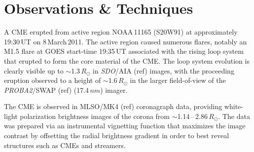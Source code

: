 \documentclass[preprint2]{aastex}
\begin{document}
\section{Observations \& Techniques}


A CME erupted from active region NOAA\,11165 (S20W91) at approximately 19:30\,UT on 8\,March\,2011. The active region caused numerous flares, notably an M1.5 flare at GOES start-time 19:35\,UT associated with the rising loop system that erupted to form the core material of the CME. The loop system evolution is clearly visible up to $\sim$1.3\,$R_{\odot}$ in \emph{SDO}/AIA (ref) images, with the proceeding eruption observed to a height of $\sim$1.6\,$R_{\odot}$ in the larger field-of-view of the \emph{PROBA2}/SWAP (ref) (17.4\,$nm$) imager.

The CME is observed in MLSO/MK4 (ref) coronagraph data, providing white-light polarization brightness images of the corona from $\sim$1.14\,--\,2.86\,$R_{\odot}$. The data was prepared via an instrumental vignetting function that maximizes the image contrast by offsetting the radial brightness gradient in order to best reveal structures such as CMEs and streamers.
\end{document}
